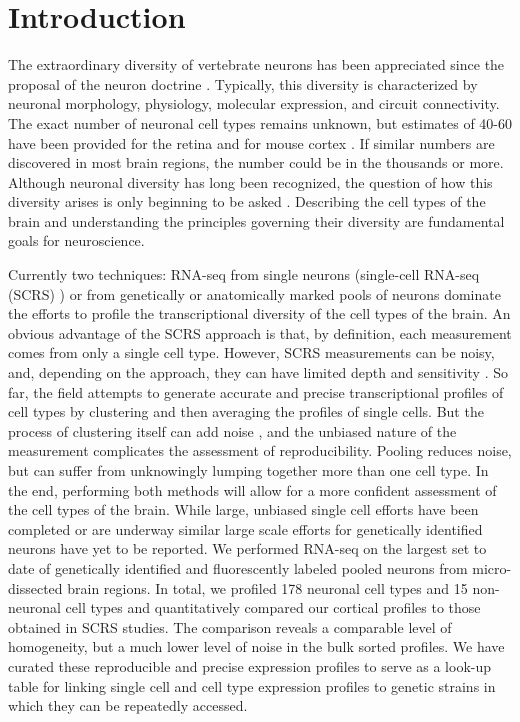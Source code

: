 \section*{Introduction}

The extraordinary diversity of vertebrate neurons has been appreciated since the proposal of the neuron doctrine \cite{0195074017}. Typically, this diversity is characterized by neuronal morphology, physiology, molecular expression, and circuit connectivity. The exact number of neuronal cell types remains unknown, but estimates of 40-60 have been provided for the retina \cite{Macosko_2015,Masland_2004} and for mouse cortex \cite{Tasic_2016,Zeisel_2015}. If similar numbers are discovered in most brain regions, the number could be in the thousands or more. Although neuronal diversity has long been recognized, the question of how this diversity arises is only beginning to be asked \cite{Arendt_2008,Muotri_2006}. Describing the cell types of the brain and understanding the principles governing their diversity are fundamental goals for neuroscience.

Currently two techniques: RNA-seq from single neurons (single-cell RNA-seq (SCRS) \cite{Shapiro_2013}) or from genetically or anatomically marked pools of neurons \cite{Okaty_2015,Cembrowski_2016} dominate the efforts to profile the transcriptional diversity of the cell types of the brain. An obvious advantage of the SCRS approach is that, by definition, each measurement comes from only a single cell type. However, SCRS measurements can be noisy, and, depending on the approach, they can have limited depth and sensitivity \cite{Parekh_2016,Svensson_2017}. So far, the field attempts to generate accurate and precise transcriptional profiles of cell types by clustering and then averaging the profiles of single cells. But the process of clustering itself can add noise \cite{Ntranos_2016}, and the unbiased nature of the measurement complicates the assessment of reproducibility. Pooling reduces noise, but can suffer from unknowingly lumping together more than one cell type. In the end, performing both methods will allow for a more confident assessment of the cell types of the brain. While large, unbiased single cell efforts have been completed or are underway similar large scale efforts for genetically identified neurons have yet to be reported. We performed RNA-seq on the largest set to date of genetically identified and fluorescently labeled pooled neurons from micro-dissected brain regions. In total, we profiled 178 neuronal cell types and 15 non-neuronal cell types and quantitatively compared our cortical profiles to those obtained in SCRS studies. The comparison reveals a comparable level of homogeneity, but a much lower level of noise in the bulk sorted profiles. We have curated these reproducible and precise expression profiles to serve as a look-up table for linking single cell and cell type expression profiles to genetic strains in which they can be repeatedly accessed. 


